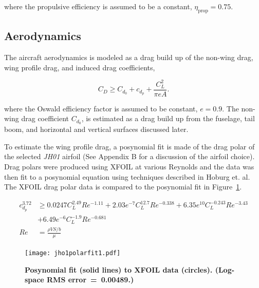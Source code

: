     where the propulsive efficiency is assumed to be a constant, $\eta_{\text{prop}} = 0.75$. 

\subsection{Aerodynamics}

The aircraft aerodynamics is modeled as a drag build up of the non-wing drag, wing profile drag, and induced drag coefficients, 

\begin{equation}
    \label{e:aerodragb}
    C_D \geq C_{d_0} + c_{d_p} + \frac{C_L^2}{\pi e A}.
    \end{equation}

where the Oswald efficiency factor is assumed to be constant, $e=0.9$. 
The non-wing drag coefficient $C_{d_0}$, is estimated as a drag build up from the fuselage, tail boom, and horizontal and vertical surfaces discussed later.

    To estimate the wing profile drag, a posynomial fit is made of the drag polar of the selected \emph{JH01} airfoil (See Appendix B for a discussion of the airfoil choice). 
    Drag polars were produced using XFOIL\cite{xfoil} at various Reynolds and the data was then fit to a posynomial equation using techniques described in Hoburg et. al.\cite{fitting}
    The XFOIL drag polar data is compared to the posynomial fit in Figure~\ref{f:JH01polar}.

    \begin{align}
        \label{e:aerodragprof}
        c_{d_p}^{3.72} &\geq 0.0247C_L^{2.49}Re^{-1.11} + 2.03e^{-7}C_L^{12.7}Re^{-0.338} + 6.35e^{10}C_L^{-0.243}Re^{-3.43} \nonumber \\
                       &+ 6.49e^{-6}C_L^{-1.9}Re^{-0.681} \\
        Re &= \frac{\rho V S/b}{\mu}
    \end{align}

\begin{figure}[H]
	\begin{center}
	\texttt{[image: jho1polarfit1.pdf]}
    \caption{\textbf{Posynomial fit (solid lines) to XFOIL data (circles).  (Log-space RMS error~=~0.00489.)}}
	\label{f:JH01polar}
	\end{center}
\end{figure}


